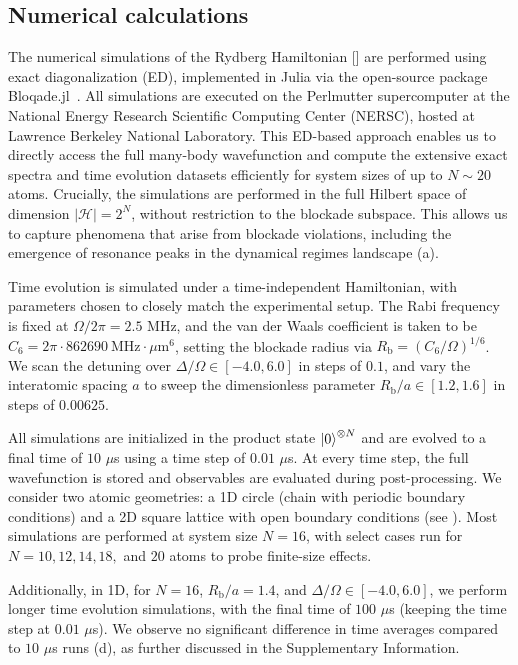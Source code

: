 \documentclass[english,floatfix,twocolumn,showpacs, aps, prx, reprint, superscriptaddress, longbibliography]{revtex4-2}
\begin{document}
\subsection{Numerical calculations}
\label{supp:subsec:methods:numerics}

The numerical simulations of the Rydberg Hamiltonian [] are performed using exact diagonalization (ED), implemented in Julia via the open-source package Bloqade.jl~\cite{BloqadeJulia:2023}. All simulations are executed on the Perlmutter supercomputer \cite{perlmutter:2023} at the National Energy Research Scientific Computing Center (NERSC), hosted at Lawrence Berkeley National Laboratory. This ED-based approach enables us to directly access the full many-body wavefunction and compute the extensive exact spectra and time evolution datasets efficiently for system sizes of up to $N \sim 20$ atoms. Crucially, the simulations are performed in the full Hilbert space of dimension $|\mathcal{H}| = 2^N$, without restriction to the blockade subspace. This allows us to capture phenomena that arise from blockade violations, including the emergence of resonance peaks in the dynamical regimes landscape (a).

Time evolution is simulated under a time-independent Hamiltonian, with parameters chosen to closely match the experimental setup. The Rabi frequency is fixed at $\Omega / 2\pi = 2.5$ MHz, and the van der Waals coefficient is taken to be $C_6 = 2\pi \cdot 862690~\mathrm{MHz} \cdot \mu\mathrm{m}^6$, setting the blockade radius via $R_\mathrm{b} = (C_6/\Omega)^{1/6}$. We scan the detuning over $\Delta / \Omega \in [-4.0, 6.0]$ in steps of $0.1$, and vary the interatomic spacing $a$ to sweep the dimensionless parameter $R_\mathrm{b} / a \in [1.2, 1.6]$ in steps of $0.00625$. 

All simulations are initialized in the product state $\ket{0}^{\otimes N}$ and are evolved to a final time of $10$ $\mu$s using a time step of $0.01$ $\mu$s. At every time step, the full wavefunction is stored and observables are evaluated during post-processing. We consider two atomic geometries: a 1D circle (chain with periodic boundary conditions) and a 2D square lattice with open boundary conditions (see ). Most simulations are performed at system size $N = 16$, with select cases run for $N = 10, 12, 14, 18,$ and $20$ atoms to probe finite-size effects. 

Additionally, in 1D, for $N=16$, $R_\mathrm{b}/a = 1.4$, and $\Delta / \Omega \in [-4.0, 6.0]$, we perform longer time evolution simulations, with the final time of $100$ $\mu$s (keeping the time step at $0.01$ $\mu$s). We observe no significant difference in time averages compared to $10$ $\mu$s runs (d), as further discussed in the Supplementary Information.
\end{document}

